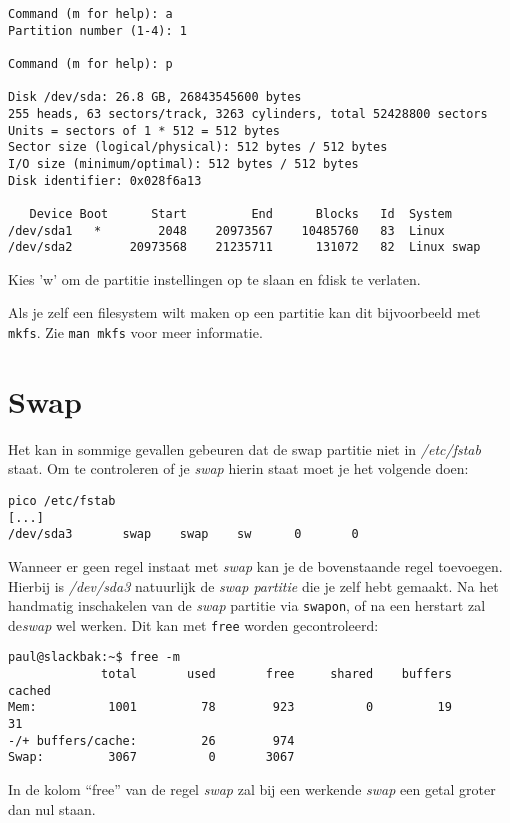 \begin{lstlisting}
Command (m for help): a 
Partition number (1-4): 1

Command (m for help): p

Disk /dev/sda: 26.8 GB, 26843545600 bytes
255 heads, 63 sectors/track, 3263 cylinders, total 52428800 sectors
Units = sectors of 1 * 512 = 512 bytes
Sector size (logical/physical): 512 bytes / 512 bytes
I/O size (minimum/optimal): 512 bytes / 512 bytes
Disk identifier: 0x028f6a13

   Device Boot      Start         End      Blocks   Id  System
/dev/sda1   *        2048    20973567    10485760   83  Linux
/dev/sda2        20973568    21235711      131072   82  Linux swap
\end{lstlisting}
Kies 'w' om de partitie instellingen op te slaan en fdisk te verlaten.

Als je zelf een filesystem wilt maken op een partitie kan dit bijvoorbeeld met \texttt{mkfs}. Zie \texttt{man mkfs} voor meer informatie.


\section{Swap}
Het kan in sommige gevallen gebeuren dat de swap partitie niet in \emph{/etc/fstab} staat. Om te controleren of je \emph{swap} hierin staat moet je het volgende doen:
\begin{lstlisting}
pico /etc/fstab
[...]
/dev/sda3       swap    swap    sw      0       0
\end{lstlisting}
Wanneer er geen regel instaat met \emph{swap} kan je de bovenstaande regel toevoegen. Hierbij is \emph{/dev/sda3} natuurlijk de \emph{swap partitie} die je zelf hebt gemaakt. Na het handmatig inschakelen van de \emph{swap} partitie via \texttt{swapon}, of na een herstart zal de\emph{swap} wel werken. Dit kan met \texttt{free} worden gecontroleerd:
\begin{lstlisting}
paul@slackbak:~$ free -m
             total       used       free     shared    buffers     cached
Mem:          1001         78        923          0         19         31
-/+ buffers/cache:         26        974
Swap:         3067          0       3067
\end{lstlisting}%
In de kolom ``free'' van de regel \emph{swap} zal bij een werkende \emph{swap} een getal groter dan nul staan. 
